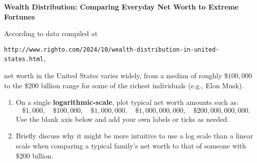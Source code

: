 \documentclass[noauthor,nooutcomes,handout,hints,12pt]{ximera}
\begin{document}
\begin{question}
    \textbf{Wealth Distribution: Comparing Everyday Net Worth to Extreme
        Fortunes}

    According to data compiled at
    \begin{center}
        \texttt{http://www.righto.com/2024/10/wealth-distribution-in-united-states.html},
    \end{center}
    net worth in the United States varies widely, from a median of
    roughly \(\$100{,}000\) to the \(\$200\) billion range for some of the
    richest individuals (e.g., Elon Musk).

    \begin{enumerate}
        \item On a single \textbf{logarithmic-scale}, plot typical net worth
              amounts such as:
              \[
                  \$1{,}000,\quad \$100{,}000,\quad \$1{,}000{,}000,\quad
                  \$1{,}000{,}000{,}000,\quad
                  \$200{,}000{,}000{,}000.
              \]
              Use the blank axis below and add your own labels or ticks as
              needed.

        \item Briefly discuss why it might be more intuitive to use a log scale
              than a linear scale when comparing a typical family's net worth
              to
              that of someone with \(\$200\) billion.
    \end{enumerate}

    \begin{center}
    \end{center}
\end{question}
\end{document}
